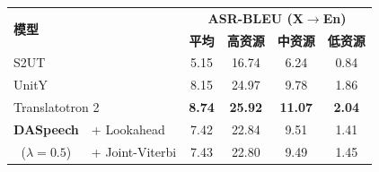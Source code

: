 \begin{table}[!htbp]
    \label{tab:daspeech_multilingual}
    \centering
    \small
    \begin{tabular}{llcccc}
        \toprule
        \multirow{2}{*}{\textbf{模型}} & & \multicolumn{4}{c}{\textbf{ASR-BLEU (X$\rightarrow$En)}} \\
         & & \textbf{平均} & \textbf{高资源} & \textbf{中资源} & \textbf{低资源} \\
        \midrule
        \multicolumn{2}{l}{S2UT \citep{s2ut}} & 5.15 & 16.74 & 6.24 & 0.84 \\
        \multicolumn{2}{l}{UnitY \citep{inaguma-etal-2023-unity}} & 8.15 & 24.97 & 9.78 & 1.86 \\
        \multicolumn{2}{l}{Translatotron 2 \citep{translatotron2}} & \textbf{8.74} & \textbf{25.92} & \textbf{11.07} & \textbf{2.04} \\
        \midrule
        \multicolumn{1}{c}{\textbf{DASpeech}} & + Lookahead & 7.42 & 22.84 & 9.51 & 1.41 \\
        \multicolumn{1}{c}{($\lambda=0.5$)} & + Joint-Viterbi & 7.43 & 22.80 & 9.49 & 1.45 \\
        \bottomrule
    \end{tabular}
\end{table}
